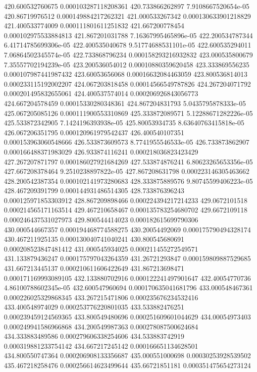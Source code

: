 {420.600532760675 0.000103287118208361
420.733866262897 7.9108667520654e-05
420.86719976512 0.000149884217262321
421.000533267342 0.000130633901218829
421.400533774009 0.000111801611251832
421.667200778454 0.000102975533884813
421.867201031788 7.16367995465896e-05
422.200534787344 6.41714785699306e-05
422.400535040678 9.51774688531101e-05
422.600535294011 7.06864502345574e-05
422.733868796234 0.000158293216932832
423.000535800679 7.35557702194239e-05
423.200536054012 0.00010880359620458
423.333869556235 0.000107987441987432
423.60053656068 0.00016632084463059
423.800536814013 0.000233115192002207
424.067203818458 0.00014566549787826
424.267204071792 0.000201495832655061
424.400537574014 0.000206926843056773
424.667204578459 0.00015330280348361
424.867204831793 5.0435795878333e-05
425.067205085126 0.000111900553310869
425.333872089571 5.12288671282226e-05
425.533872342905 7.1424196393938e-05
425.80053934735 8.63640763415818e-05
426.067206351795 0.000120961979542437
426.400540107351 0.000153963060548666
426.533873609573 8.7741955546533e-05
426.733873862907 0.000166488371983029
426.933874116241 0.000218036823423429
427.267207871797 0.000186027921684269
427.533874876241 6.80623265653356e-05
427.667208378464 9.2510238897822e-05
427.867208631798 0.000223146305463662
428.200542387354 0.000102141973280683
428.333875889576 9.80745599406223e-05
428.467209391799 0.000144931486514305
428.733876396243 0.000125971853303912
428.867209898466 0.000224394217214233
429.0672101518 0.000214565171163514
429.467210658467 0.000135783254680702
429.6672109118 0.000246437531027973
429.800544414023 0.000182615699790306
430.000544667357 0.000194468774588275
430.20054492069 0.000175790494328174
430.467211925135 0.000130040741040241
430.800545680691 0.000208523847481412
431.000545934025 0.000211455272549571
431.133879436247 0.000175797043264359
431.26721293847 0.000159809887529685
431.667213445137 0.000210611606422649
431.867213698471 0.000171169993089105
432.133880702916 0.000122241497901647
432.40054770736 4.86100788602345e-05
432.600547960694 0.000170635041681796
433.000548467361 0.000226025329868345
433.267215471806 0.000235676234532416
433.400548974029 0.000253776220801035
433.533882476251 0.000239459124569365
433.800549480696 0.000251609601044629
434.00054973403 0.000249941586966868
434.200549987363 0.000278087500624684
434.333883489586 0.000279606338254606
434.533883742919 0.000319881233754142
434.667217245142 0.000166651134628501
434.800550747364 0.000206908133356687
435.000551000698 0.00030253928539502
435.467218258476 0.000256614623499644
435.66721851181 0.000351475654273124
}

